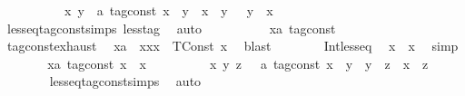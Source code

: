 \begin{isabellebody}
\isanewline
\ \ \isamarkupfalse%
%
\isadelimproof
\ %
\endisadelimproof
%
\isatagproof
{}\isamarkupfalse%
\isanewline
\ \ \ \ \isamarkupfalse%
\ {\isacartoucheopen}{\isasymAnd}x\ y\ {\isacharcolon}{\isacharcolon}\ {\isacharprime}a\ tag{\isacharunderscore}const{\isachardot}\ {\isacharparenleft}x\ {\isacharless}\ y{\isacharparenright}\ {\isacharequal}\ {\isacharparenleft}x\ {\isasymle}\ y\ {\isasymand}\ {\isasymnot}\ y\ {\isasymle}\ x{\isacharparenright}{\isacartoucheclose}\isanewline
\ \ \ \ \ \ \isamarkupfalse%
\ less{\isacharunderscore}eq{\isacharunderscore}tag{\isacharunderscore}const{\isachardot}simps\ less{\isacharunderscore}tag\ \isamarkupfalse%
\ auto\isanewline
\ \ \isamarkupfalse%
\isanewline
\ \ \ \ \isacommand{{\isacharbraceleft}}\isamarkupfalse%
\ \isamarkupfalse%
\ x{\isacharcolon}{\isacharcolon}{\isacartoucheopen}{\isacharprime}a\ tag{\isacharunderscore}const{\isacartoucheclose}\isanewline
\ \ \ \ \ \ \isamarkupfalse%
\ tag{\isacharunderscore}const{\isachardot}exhaust\ \isamarkupfalse%
\ xa\ \ xx{}{\isacharcolon}{\isacartoucheopen}x\ {\isacharequal}\ TConst\ x\ \isamarkupfalse%
\ blast\isanewline
\ \ \ \ \ \ \isamarkupfalse%
\ Int{\isacharunderscore}less{\isacharunderscore}eq\ \isamarkupfalse%
\ {\isacartoucheopen}x\ {\isasymle}\ x{\isacartoucheclose}\ \isamarkupfalse%
\ simp\isanewline
\ \ \ \ \isacommand{{\isacharbraceright}}\isamarkupfalse%
\ \isamarkupfalse%
\ {\isacartoucheopen}{\isasymAnd}x{\isacharcolon}{\isacharcolon}{\isacharprime}a\ tag{\isacharunderscore}const{\isachardot}\ x\ {\isasymle}\ x{\isacartoucheclose}\ \isacommand{{\isachardot}}\isamarkupfalse%
\isanewline
\ \ \isamarkupfalse%
\isanewline
\ \ \ \ \isamarkupfalse%
\ {\isacartoucheopen}{\isasymAnd}x\ y\ z\ \ {\isacharcolon}{\isacharcolon}\ {\isacharprime}a\ tag{\isacharunderscore}const{\isachardot}\ x\ {\isasymle}\ y\ {\isasymLongrightarrow}\ y\ {\isasymle}\ z\ {\isasymLongrightarrow}\ x\ {\isasymle}\ z{\isacartoucheclose}\isanewline
\ \ \ \ \ \ \isamarkupfalse%
\ less{\isacharunderscore}eq{\isacharunderscore}tag{\isacharunderscore}const{\isachardot}simps\ \isamarkupfalse%
\ auto\isanewline
\ \ \isamarkupfalse%
\isanewline

\end{isabellebody}
